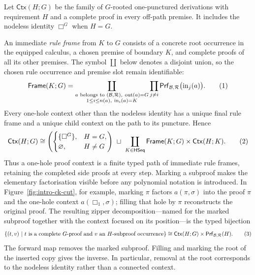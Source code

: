 \documentclass[10pt,a4paper]{article}
\theoremstyle{plain}
\theoremstyle{definition}
\theoremstyle{remark}
\newcommand{\Base}{\mathcal B}
\newcommand{\Rules}{\mathcal R}
\newcommand{\HSeq}{\mathsf{HSeq}}
\newcommand{\Ctx}{\mathsf{Ctx}}
\newcommand{\Prf}{\mathsf{Prf}}
\newcommand{\eqtag}{\refstepcounter{equation}\tag{\theequation}}
\begin{document}
Let \(\Ctx(H;G)\) be the family of \(G\)-rooted one-punctured
derivations with requirement \(H\) and a complete proof in every
off-path premise.  It includes the nodeless identity \(\Box^G\) when
\(H=G\).

An immediate \emph{rule frame} from \(K\) to \(G\) consists of a concrete
root occurrence in the equipped calculus, a chosen premise of boundary
\(K\), and complete proofs
of all its other premises.  The symbol \(\coprod\) below denotes a disjoint
union, so the chosen rule occurrence and premise slot remain identifiable:
\[
 \mathsf{Frame}(K;G)=
 \coprod_{\substack{a\text{ belongs to }(\Base,\Rules),\
                    \operatorname{out}(a)=G\\
                   1\le i\le n(a),\ \operatorname{in}_i(a)=K}}
       \prod_{j\ne i}
          \Prf_{\Base,\Rules}\bigl(\operatorname{in}_j(a)\bigr).
\eqtag\label{eq:one-rule-frame}
\]
Every one-hole context other than the nodeless identity has a unique final rule frame and a
unique child context on the path to its puncture.  Hence
\[
 \Ctx(H;G)\cong
 \left(
 \begin{cases}
   \{\Box^G\},&H=G,\\
   \varnothing,&H\ne G
 \end{cases}
 \right)
 \ \sqcup\
 \coprod_{K\in\HSeq}
      \mathsf{Frame}(K;G)\times\Ctx(H;K).
\eqtag\label{eq:one-hole-frame-recursion}
\]
Thus a one-hole proof context is a finite typed path of immediate rule
frames, retaining the completed side proofs at every step.  Marking a
subproof makes the elementary factorisation visible before any polynomial
notation is introduced.  In Figure~\ref{fig:intro-ck-cut}, for example,
marking \(\pi\) factors \(a(\pi,\sigma)\) into the proof \(\pi\) and the
one-hole context \(a(\Box_1,\sigma)\); filling that hole by \(\pi\)
reconstructs the original proof.  The resulting zipper
decomposition---named for
the marked subproof together with the context focused on its position---is
the typed bijection
\[
 \left\{(t,v)\ \middle|\
 t\text{ is a complete \(G\)-proof and \(v\) an
 \(H\)-subproof occurrence}\right\}
 \cong \Ctx(H;G)\times\Prf_{\Base,\Rules}(H) .
\eqtag\label{eq:typed-zipper}
\]
The forward map removes the marked subproof.  Filling and marking the root
of the inserted copy gives the inverse.  In particular, removal at the
root corresponds to the nodeless identity rather than a connected context.
\end{document}
